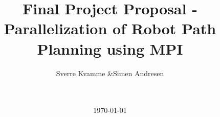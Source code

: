 



\title{Final Project Proposal - Parallelization of Robot Path Planning using MPI}
\author{Sverre Kvamme \&Simen Andresen}
\date{\ \\ \ \\ \today}




\maketitle


\pagestyle{fancy}
\lhead{}
\rhead{\thepage}
\setcounter{page}{1}

\rhead{\thepage}
\cfoot{}


%



